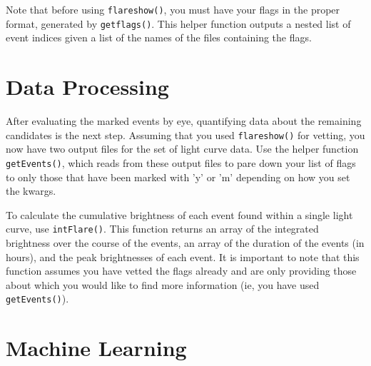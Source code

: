 \documentclass[11pt]{article}
\begin{document}
Note that before using \verb|flareshow()|, you must have your flags in
the proper format, generated by \verb|getflags()|.  This helper
function outputs a nested list of event indices given a list of the
names of the files containing the flags.

\section{Data Processing}
\label{sec:advanced}

After evaluating the marked events by eye, quantifying data about the
remaining candidates is the next step.  Assuming that you used
\verb|flareshow()| for vetting, you now have two output files for the
set of light curve data.  Use the helper function \verb|getEvents()|,
which reads from these output files to pare down your list of flags to
only those that have been marked with 'y' or 'm' depending on how you
set the kwargs.

To calculate the cumulative brightness of each event found within a
single light curve, use \verb|intFlare()|.  This function returns an
array of the integrated brightness over the course of the events, an
array of the duration of the events (in hours), and the peak
brightnesses of each event.  It is important to note that this
function assumes you have vetted the flags already and are only
providing those about which you would like to find more information
(ie, you have used \verb|getEvents()|).


\section{Machine Learning}
\label{sec:ml}
\end{document}
